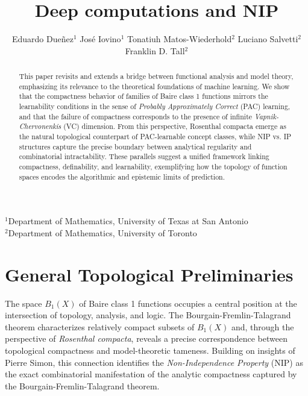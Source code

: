 \documentclass[psamsfonts]{amsart}
\title{Deep computations and NIP}
\author[Dueñez, Iovino, Matos-Wiederhold, Salvetti, Tall]{
Eduardo Dueñez$^{1}$ \qquad
José Iovino$^{1}$ \qquad
Tonatiuh Matos-Wiederhold$^{2}$ \qquad
Luciano Salvetti$^{2}$ \qquad
Franklin D. Tall$^{2}$
}
\theoremstyle{definition}
\theoremstyle{remark}
\numberwithin{equation}{section}
\begin{document}
\maketitle

{\centering\tiny\vspace{-0.6cm}
$^{1}$Department of Mathematics, University of Texas at San Antonio\\
$^{2}$Department of Mathematics, University of Toronto\\
}

\begin{abstract}
This paper revisits and extends a bridge between functional analysis and model theory, emphasizing its relevance to the theoretical foundations of machine learning. We show that the compactness behavior of families of Baire class 1 functions mirrors the learnability conditions in the sense of \emph{Probably Approximately Correct} (PAC) learning, and that the failure of compactness corresponds to the presence of infinite \emph{Vapnik-Chervonenkis} (VC) dimension. From this perspective, Rosenthal compacta emerge as the natural topological counterpart of PAC-learnable concept classes, while NIP vs. IP structures capture the precise boundary between analytical regularity and combinatorial intractability. These parallels suggest a unified framework linking compactness, definability, and learnability, exemplifying how the topology of function spaces encodes the algorithmic and epistemic limits of prediction.
\end{abstract}

\maketitle

\section{General Topological Preliminaries}

The space $B_1(X)$ of Baire class 1 functions occupies a central position at the intersection of topology, analysis, and logic. The Bourgain-Fremlin-Talagrand theorem characterizes relatively compact subsets of $B_1(X)$ and, through the perspective of \emph{Rosenthal compacta}, reveals a precise correspondence between topological compactness and model-theoretic tameness. Building on insights of Pierre Simon, this connection identifies the \emph{Non-Independence Property} (NIP) as the exact combinatorial manifestation of the analytic compactness captured by the Bourgain-Fremlin-Talagrand theorem.
\end{document}
